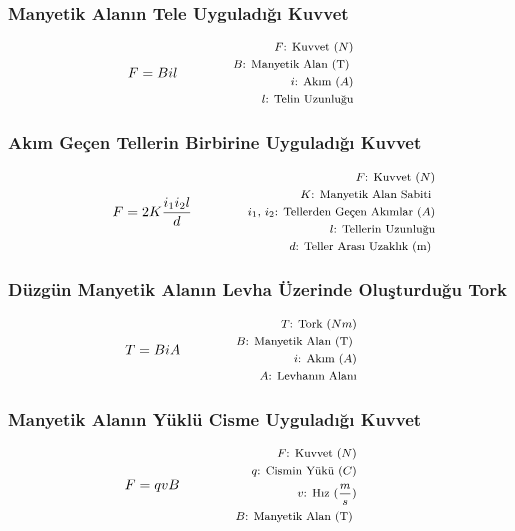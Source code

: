 \subsubsection*{Manyetik Alanın Tele Uyguladığı Kuvvet}
\begin{equation}
    F = B i l \qquad \qquad \parbox{4cm}{\footnotesize$\begin{aligned}
        F\text{: Kuvvet } (N) \\
        B\text{: Manyetik Alan (T) } \\
        i\text{: Akım } (A) \\
        l\text{: Telin Uzunluğu}
\end{aligned}$}
\end{equation}

\subsubsection*{Akım Geçen Tellerin Birbirine Uyguladığı Kuvvet}
\begin{equation}
    F = 2K \frac{i_1 i_2 l}{d} \qquad \qquad \parbox{4cm}{\footnotesize$\begin{aligned}
        F\text{: Kuvvet } (N) \\
        K\text{: Manyetik Alan Sabiti } \\
        i_1\text{, }i_2\text{: Tellerden Geçen Akımlar } (A) \\
        l\text{: Tellerin Uzunluğu} \\
        d\text{: Teller Arası Uzaklık (m) }
\end{aligned}$}
\end{equation}

\subsubsection*{Düzgün Manyetik Alanın Levha Üzerinde Oluşturduğu Tork}
\begin{equation}
    T = B i A \qquad \qquad \parbox{4cm}{\footnotesize$\begin{aligned}
        T\text{: Tork } (Nm) \\
        B\text{: Manyetik Alan (T) } \\
        i\text{: Akım } (A) \\
        A\text{: Levhanın Alanı} \\
\end{aligned}$}
\end{equation}

\subsubsection*{Manyetik Alanın Yüklü Cisme Uyguladığı Kuvvet}
\begin{equation}
    F = qvB \qquad \qquad \parbox{4cm}{\footnotesize$\begin{aligned}
        F\text{: Kuvvet } (N) \\
        q\text{: Cismin Yükü } (C) \\
        v\text{: Hız } (\frac{m}{s}) \\
        B\text{: Manyetik Alan (T) }
\end{aligned}$}
\end{equation}

